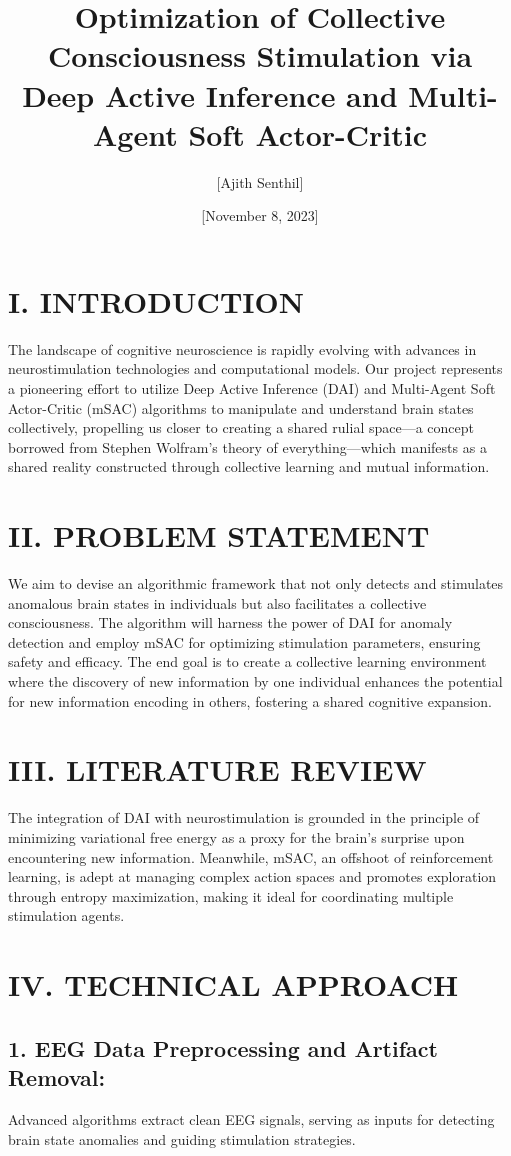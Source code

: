 \documentclass{article}
\title{Optimization of Collective Consciousness Stimulation via Deep Active Inference and Multi-Agent Soft Actor-Critic}
\author{[Ajith Senthil]}
\date{[November 8, 2023]}
\begin{document}
\maketitle

\section*{I. INTRODUCTION}
The landscape of cognitive neuroscience is rapidly evolving with advances in neurostimulation technologies and computational models. Our project represents a pioneering effort to utilize Deep Active Inference (DAI) and Multi-Agent Soft Actor-Critic (mSAC) algorithms to manipulate and understand brain states collectively, propelling us closer to creating a shared rulial space—a concept borrowed from Stephen Wolfram's theory of everything—which manifests as a shared reality constructed through collective learning and mutual information.

\section*{II. PROBLEM STATEMENT}
We aim to devise an algorithmic framework that not only detects and stimulates anomalous brain states in individuals but also facilitates a collective consciousness. The algorithm will harness the power of DAI for anomaly detection and employ mSAC for optimizing stimulation parameters, ensuring safety and efficacy. The end goal is to create a collective learning environment where the discovery of new information by one individual enhances the potential for new information encoding in others, fostering a shared cognitive expansion.

\section*{III. LITERATURE REVIEW}
The integration of DAI with neurostimulation is grounded in the principle of minimizing variational free energy as a proxy for the brain's surprise upon encountering new information. Meanwhile, mSAC, an offshoot of reinforcement learning, is adept at managing complex action spaces and promotes exploration through entropy maximization, making it ideal for coordinating multiple stimulation agents.

\section*{IV. TECHNICAL APPROACH}
\subsection*{1. EEG Data Preprocessing and Artifact Removal:}
Advanced algorithms extract clean EEG signals, serving as inputs for detecting brain state anomalies and guiding stimulation strategies.
\end{document}
